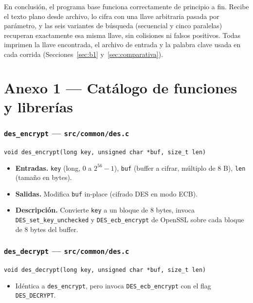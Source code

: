 \documentclass[11pt,letterpaper]{article}
\begin{document}
En conclusión, el programa base funciona correctamente de principio a
fin. Recibe el texto plano desde archivo, lo cifra con una llave
arbitraria pasada por parámetro, y las seis variantes de búsqueda
(secuencial y cinco paralelas) recuperan exactamente esa misma llave,
sin colisiones ni falsos positivos.
Todas imprimen la llave encontrada, el archivo de entrada y la palabra
clave usada en cada corrida (Secciones~\ref{sec:b1}
y~\ref{sec:comparativa}).

\section{Anexo 1 --- Catálogo de funciones y librerías}
\label{sec:anexo1}

\subsubsection*{\texttt{des\_encrypt} --- \texttt{src/common/des.c}}
\small\texttt{void des\_encrypt(long key, unsigned char *buf, size\_t len)}\normalsize
\begin{itemize}[nosep]
    \item \textbf{Entradas.} \texttt{key} (long, $0$ a $2^{56}-1$), \texttt{buf} (buffer a cifrar, múltiplo de 8 B), \texttt{len} (tamaño en bytes).
    \item \textbf{Salidas.} Modifica \texttt{buf} in-place (cifrado DES en modo ECB).
    \item \textbf{Descripción.} Convierte \texttt{key} a un bloque de 8 bytes, invoca \texttt{DES\_set\_key\_unchecked} y \texttt{DES\_ecb\_encrypt} de OpenSSL sobre cada bloque de 8 bytes del buffer.
\end{itemize}

\subsubsection*{\texttt{des\_decrypt} --- \texttt{src/common/des.c}}
\small\texttt{void des\_decrypt(long key, unsigned char *buf, size\_t len)}\normalsize
\begin{itemize}[nosep]
    \item Idéntica a \texttt{des\_encrypt}, pero invoca \texttt{DES\_ecb\_encrypt} con el flag \texttt{DES\_DECRYPT}.
\end{itemize}
\end{document}
